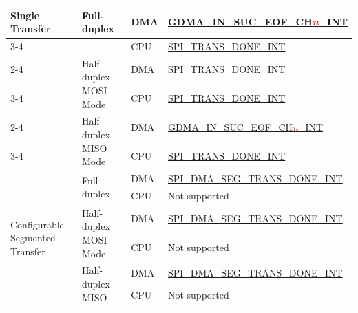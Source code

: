 \documentclass[main\_\_EN.tex]{subfiles}
\begin{document}
\begin{ThreePartTable}
\begin{longtable}[c]{|l|l|l|l|}
\multirow{6}{*}{Single Transfer} & \multirow{2}{*}{Full-duplex} & DMA & \hyperref[int:GDMAINSUCEOFINT]{GDMA\_IN\_SUC\_EOF\_CH\textcolor{red}{\it{n}}\_INT} \tnote{1} \\ \cline{3-4}
&& CPU & \hyperref[int:SPITRANSDONEINT]{SPI\_TRANS\_DONE\_INT} \tnote{2}  \\ \cline{2-4}
& \multirow{2}{*}{Half-duplex MOSI Mode} & DMA & \hyperref[int:SPITRANSDONEINT]{SPI\_TRANS\_DONE\_INT} \\ \cline{3-4}
&& CPU & \hyperref[int:SPITRANSDONEINT]{SPI\_TRANS\_DONE\_INT}  \\ \cline{2-4}
& \multirow{2}{*}{Half-duplex MISO Mode} & DMA & \hyperref[int:GDMAINSUCEOFINT]{GDMA\_IN\_SUC\_EOF\_CH\textcolor{red}{\it{n}}\_INT} \\ \cline{3-4}
&& CPU & \hyperref[int:SPITRANSDONEINT]{SPI\_TRANS\_DONE\_INT} \\ \hline
\multirow{6}{*}{Configurable Segmented Transfer} & \multirow{2}{*}{Full-duplex} & DMA & \hyperref[int:SPIDMASEGTRANSDONEINT]{SPI\_DMA\_SEG\_TRANS\_DONE\_INT} \tnote{3} \\ \cline{3-4}
&& CPU & Not supported       \\ \cline{2-4}
& \multirow{2}{*}{Half-duplex MOSI Mode} & DMA  & \hyperref[int:SPIDMASEGTRANSDONEINT]{SPI\_DMA\_SEG\_TRANS\_DONE\_INT} \\ \cline{3-4}
&& CPU           & Not supported       \\ \cline{2-4}
& \multirow{2}{*}{Half-duplex MISO} & DMA & \hyperref[int:SPIDMASEGTRANSDONEINT]{SPI\_DMA\_SEG\_TRANS\_DONE\_INT} \\ \cline{3-4}
&& CPU & Not supported       \\ \hline
\end{longtable}
\end{ThreePartTable}

\clearpage
\end{document}

